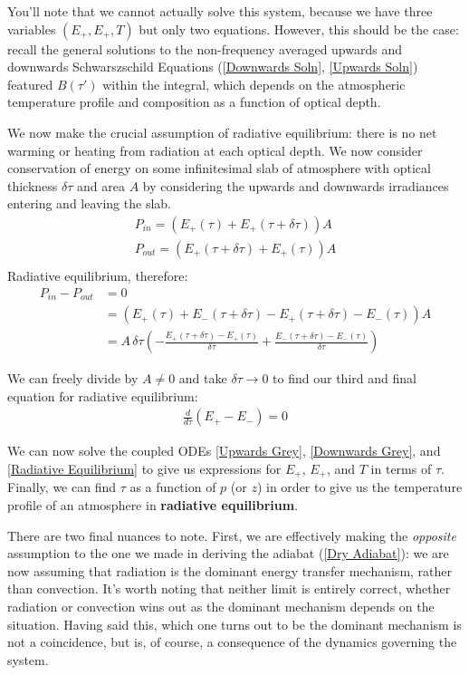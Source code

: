 You'll note that we cannot actually solve this system, because we have three variables $(E_+,E_+,T)$ but only two equations. However, this should be the case: recall the general solutions to the non-frequency averaged upwards and downwards Schwarszschild Equations (\ref{Downwards Soln}, \ref{Upwards Soln}) featured $B(\tau')$ within the integral, which depends on the atmospheric temperature profile and composition as a function of optical depth. 

We now make the crucial assumption of radiative equilibrium: there is no net warming or heating from radiation at each optical depth. We now consider conservation of energy on some infinitesimal slab of atmosphere with optical thickness $\delta \tau$ and area $A$ by considering the upwards and downwards irradiances entering and leaving the slab. 
\begin{align*}
    P_{in}=(E_+(\tau)+E_+(\tau+\delta\tau))A\\
    P_{out}=(E_+(\tau+\delta\tau)+E_+(\tau))A\\
\end{align*}
Radiative equilibrium, therefore:
\begin{align*}
    P_{in}-P_{out}&=0\\
    &= (E_+(\tau)+E_-(\tau+\delta\tau)-E_+(\tau+\delta\tau)-E_-(\tau))A\\
    &=A\,\delta\tau
    \left(-
    \frac{E_+(\tau+\delta\tau)-E_+(\tau)}{\delta \tau}
    +
    \frac{E_-(\tau+\delta\tau)-E_-(\tau)}{\delta \tau}
    \right)
\end{align*}

We can freely divide by $A\neq0$ and take $\delta\tau\to0$ to find our third and final equation for radiative equilibrium:
\begin{align}\label{Radiative Equilibrium}
    \frac{d}{d\tau}(E_+-E_-)=0
\end{align}

We can now solve the coupled ODEs \ref{Upwards Grey}, \ref{Downwards Grey}, and \ref{Radiative Equilibrium} to give us expressions for $E_+$, $E_+$, and $T$ in terms of $\tau$. Finally, we can find $\tau$ as a function of $p$ (or $z$) in order to give us the temperature profile of an atmosphere in \textbf{radiative equilibrium}. 

There are two final nuances to note. First, we are effectively making the \textit{opposite} assumption to the one we made in deriving the adiabat (\ref{Dry Adiabat}): we are now assuming that radiation is the dominant energy transfer mechanism, rather than convection. It's worth noting that neither limit is entirely correct, whether radiation or convection wins out as the dominant mechanism depends on the situation. Having said this, which one turns out to be the dominant mechanism is not a coincidence, but is, of course, a consequence of the dynamics governing the system.

